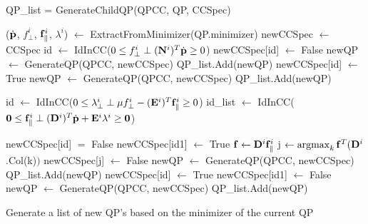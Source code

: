 \begin{algorithm}[!b]
QP\_list = GenerateChildQP(QPCC, QP, CCSpec)\\
\Begin
{
    {
        ($\dot{\mathbf{p}}$, $f_{\perp}^{i}$, $\mathbf{f}_{\parallel}^{i}$, $\lambda^{i}$) $\leftarrow$ ExtractFromMinimizer(QP.minimizer)\;
        newCCSpec $\leftarrow$ CCSpec\;
        id $\leftarrow$ IdInCC($0 \leq f_{\perp}^{i} \perp (\mathbf{N}^{i})^T\dot{\mathbf{p}} \geq 0$)\;
        {
            newCCSpec[id] $\leftarrow$ False\;
            newQP $\leftarrow$ GenerateQP(QPCC, newCCSpec)\;
            QP\_list.Add(newQP)\;
        }
        {
            newCCSpec[id] $\leftarrow$ True\;
            newQP $\leftarrow$ GenerateQP(QPCC, newCCSpec)\;
            QP\_list.Add(newQP)\;
        }


        id $\leftarrow$ IdInCC($0 \leq \lambda_{\perp}^{i} \perp \mu f_{\perp}^i-(\mathbf{E}^{i})^T\mathbf{f}_{\parallel}^i \geq 0$)\;
        id\_list $\leftarrow$ IdInCC($\mathbf{0}\leq\mathbf{f}_{\parallel}^i\perp (\mathbf{D}^i)^T\dot{\mathbf{p}}+\mathbf{E}^i\lambda^i \geq \mathbf{0}$)\;

        {
            newCCSpec[id] $=$ False\;
            {
                newCCSpec[id1] $\leftarrow$ True\;
            }
            $\mathbf{f} \leftarrow \mathbf{D}^i \mathbf{f}_{\parallel}^i$\;
            j $\leftarrow \argmax_{k} \vc{f}^T (\vc{D}^i$.Col(k)$)$\;
            newCCSpec[j] $\leftarrow$ False\;
            newQP $\leftarrow$ GenerateQP(QPCC, newCCSpec)\;
            QP\_list.Add(newQP)\;
        }
        {
            newCCSpec[id] $\leftarrow$ True\;
            {
                newCCSpec[id1] $\leftarrow$ False\;
            }
            newQP $\leftarrow$ GenerateQP(QPCC, newCCSpec)\;
            QP\_list.Add(newQP)\;
        }

    }
    \;
}

\caption{Generate a list of new QP's based on the minimizer of the current QP} \label{alg:childQP}
\end{algorithm}


